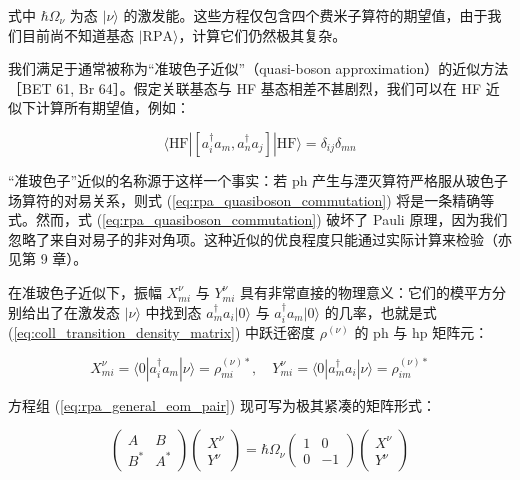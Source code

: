 式中 $\hbar\Omega_{\nu}$ 为态 $|\nu\rangle$ 的激发能。这些方程仅包含四个费米子算符的期望值，由于我们目前尚不知道基态
$|\text{RPA}\rangle$，计算它们仍然极其复杂。

我们满足于通常被称为“准玻色子近似”（quasi-boson approximation）的近似方法［BET 61, Br 64］。假定关联基态与
HF 基态相差不甚剧烈，我们可以在 HF 近似下计算所有期望值，例如：

\begin{equation}
\langle\text{HF}|[a^{\dagger}_{i}a_{m},a^{\dagger}_{n}a_{j}]|\text{HF}\rangle=\delta_{ij}\delta_{mn}\label{eq:rpa_quasiboson_commutation}
\end{equation}

“准玻色子”近似的名称源于这样一个事实：若 ph 产生与湮灭算符严格服从玻色子场算符的对易关系，则式 (\ref{eq:rpa_quasiboson_commutation})
将是一条精确等式。然而，式 (\ref{eq:rpa_quasiboson_commutation}) 破坏了 Pauli 原理，因为我们忽略了来自对易子的非对角项。这种近似的优良程度只能通过实际计算来检验（亦见第
9 章）。

在准玻色子近似下，振幅 $X^{\nu}_{mi}$ 与 $Y^{\nu}_{mi}$ 具有非常直接的物理意义：它们的模平方分别给出了在激发态
$|\nu\rangle$ 中找到态 $a^{\dagger}_{m}a_{i}|0\rangle$ 与 $a^{\dagger}_{i}a_{m}|0\rangle$
的几率，也就是式 (\ref{eq:coll_transition_density_matrix}) 中跃迁密度 $\rho^{(\nu)}$
的 ph 与 hp 矩阵元：

\begin{equation}
X^{\nu}_{mi}=\langle0|a^{\dagger}_{i}a_{m}|\nu\rangle=\rho^{(\nu)*}_{mi},\quad Y^{\nu}_{mi}=\langle0|a^{\dagger}_{m}a_{i}|\nu\rangle=\rho^{(\nu)*}_{im}\label{eq:rpa_xy_amplitudes_density}
\end{equation}

方程组 (\ref{eq:rpa_general_eom_pair}) 现可写为极其紧凑的矩阵形式：

\begin{equation}
\begin{pmatrix}A & B\\
B^{*} & A^{*}
\end{pmatrix}\begin{pmatrix}X^{\nu}\\
Y^{\nu}
\end{pmatrix}=\hbar\Omega_{\nu}\begin{pmatrix}1 & 0\\
0 & -1
\end{pmatrix}\begin{pmatrix}X^{\nu}\\
Y^{\nu}
\end{pmatrix}\label{eq:rpa_matrix_equation}
\end{equation}

